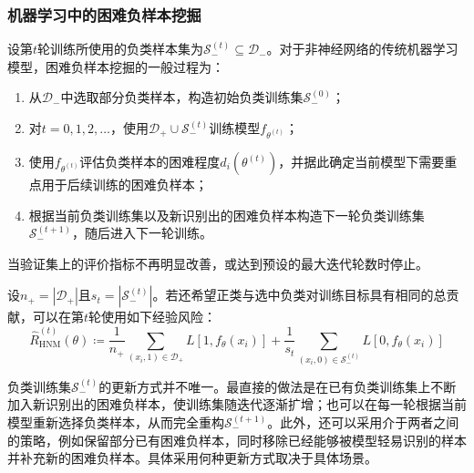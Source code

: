 \subsubsection{机器学习中的困难负样本挖掘}
\begin{method}
	设第$t$轮训练所使用的负类样本集为$\mathcal{S}_{-}^{(t)}\subseteq\mathcal{D}_{-}$。对于非神经网络的传统机器学习模型，困难负样本挖掘的一般过程为：
	\begin{enumerate}
		\item 从$\mathcal{D}_{-}$中选取部分负类样本，构造初始负类训练集$\mathcal{S}_{-}^{(0)}$；
		\item 对$t=0,1,2,\ldots$，使用$\mathcal{D}_{+}\cup\mathcal{S}_{-}^{(t)}$训练模型$f_{\theta^{(t)}}$；
		\item 使用$f_{\theta^{(t)}}$评估负类样本的困难程度$d_i(\theta^{(t)})$，并据此确定当前模型下需要重点用于后续训练的困难负样本；
		\item 根据当前负类训练集以及新识别出的困难负样本构造下一轮负类训练集$\mathcal{S}_{-}^{(t+1)}$，随后进入下一轮训练。
	\end{enumerate}
	当验证集上的评价指标不再明显改善，或达到预设的最大迭代轮数时停止。
\end{method}
设$n_{+}=|\mathcal{D}_{+}|$且$s_t=|\mathcal{S}_{-}^{(t)}|$。若还希望正类与选中负类对训练目标具有相同的总贡献，可以在第$t$轮使用如下经验风险：
\begin{equation*}
	\hat{R}_{\mathrm{HNM}}^{(t)}(\theta)\coloneq\frac{1}{n_{+}}\sum_{(x_i,1)\in\mathcal{D}_{+}}L[1,f_{\theta}(x_i)]
	+\frac{1}{s_t}\sum_{(x_i,0)\in\mathcal{S}_{-}^{(t)}}L[0,f_{\theta}(x_i)]
\end{equation*}\par
负类训练集$\mathcal{S}_{-}^{(t)}$的更新方式并不唯一。最直接的做法是在已有负类训练集上不断加入新识别出的困难负样本，使训练集随迭代逐渐扩增；也可以在每一轮根据当前模型重新选择负类样本，从而完全重构$\mathcal{S}_{-}^{(t+1)}$。此外，还可以采用介于两者之间的策略，例如保留部分已有困难负样本，同时移除已经能够被模型轻易识别的样本并补充新的困难负样本。具体采用何种更新方式取决于具体场景。
